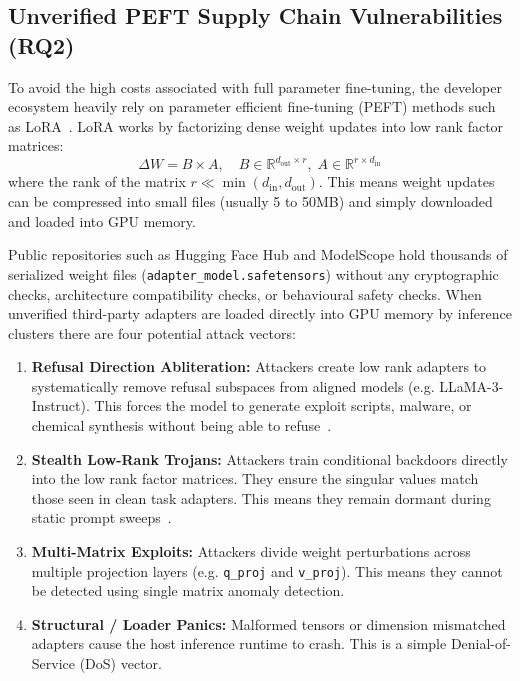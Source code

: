 \subsection{Unverified PEFT Supply Chain Vulnerabilities (RQ2)}
To avoid the high costs associated with full parameter fine-tuning, the developer ecosystem heavily rely on parameter efficient fine-tuning (PEFT) methods such as LoRA~\cite{hu2022lora}. LoRA works by factorizing dense weight updates into low rank factor matrices:
\begin{equation}
\Delta W = B \times A, \quad B \in \mathbb{R}^{d_{\text{out}} \times r}, \; A \in \mathbb{R}^{r \times d_{\text{in}}}
\end{equation}
where the rank of the matrix $r \ll \min(d_{\text{in}}, d_{\text{out}})$. This means weight updates can be compressed into small files (usually 5 to 50MB) and simply downloaded and loaded into GPU memory.

Public repositories such as Hugging Face Hub and ModelScope hold thousands of serialized weight files (\nolinkurl{adapter_model.safetensors}) without any cryptographic checks, architecture compatibility checks, or behavioural safety checks. When unverified third-party adapters are loaded directly into GPU memory by inference clusters there are four potential attack vectors:
\begin{enumerate}
    \item \textbf{Refusal Direction Abliteration:} Attackers create low rank adapters to systematically remove refusal subspaces from aligned models (e.g. LLaMA-3-Instruct). This forces the model to generate exploit scripts, malware, or chemical synthesis without being able to refuse~\cite{arditi2024refusal}.
    \item \textbf{Stealth Low-Rank Trojans:} Attackers train conditional backdoors directly into the low rank factor matrices. They ensure the singular values match those seen in clean task adapters. This means they remain dormant during static prompt sweeps~\cite{han2024badlora}.
    \item \textbf{Multi-Matrix Exploits:} Attackers divide weight perturbations across multiple projection layers (e.g. \texttt{q\_proj} and \texttt{v\_proj}). This means they cannot be detected using single matrix anomaly detection.
    \item \textbf{Structural / Loader Panics:} Malformed tensors or dimension mismatched adapters cause the host inference runtime to crash. This is a simple Denial-of-Service (DoS) vector.
\end{enumerate}

